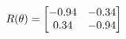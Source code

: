 \documentclass[preview]{standalone}
\begin{document}
\begin{align*}
\special{dvisvgm:raw <g id='unique000'>}R(\theta) = \begin{bmatrix}-0.94 & -0.34\\0.34 & -0.94\end{bmatrix}\special{dvisvgm:raw </g>}
\end{align*}
\end{document}
